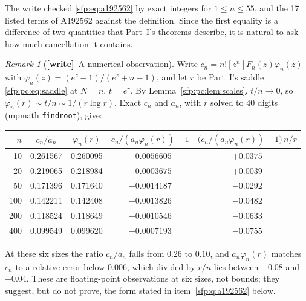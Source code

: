 \documentclass[11pt,letterpaper]{article}
\numberwithin{equation}{section}
\theoremstyle{definition}\newtheorem{definition}[theorem]{Definition}
\theoremstyle{remark}\newtheorem{remark}[theorem]{Remark}
\newcommand{\wtag}{\textup{\textbf{[write]}}}
\begin{document}
The write checked \eqref{sfp:eq:a192562} by exact integers for $1\le n\le55$, and the 17 listed terms of A192562 against the definition. Since the first equality is a difference of two quantities that Part~I's theorems describe, it is natural to ask how much cancellation it contains.

\begin{remark}[\wtag\ A numerical observation]\label{sfp:rem:a192562}
Write $c_n=n![z^n]F_n(z)\varphi_n(z)$ with $\varphi_n(z)=(e^z-1)/(e^z+n-1)$, and let $r$ be Part~I's saddle \eqref{sfp:pc:eq:saddle} at $N=n$, $t=e^r$. By Lemma~\ref{sfp:pc:lem:scales}, $t/n\to0$, so $\varphi_n(r)\sim t/n\sim1/(r\log r)$. Exact $c_n$ and $a_n$, with $r$ solved to 40 digits (mpmath \texttt{findroot}), give:
\begin{center}
\small
\begin{tabular}{@{}rcccc@{}}
\toprule
$n$ & $c_n/a_n$ & $\varphi_n(r)$ & $c_n/(a_n\varphi_n(r))-1$ & $\bigl(c_n/(a_n\varphi_n(r))-1\bigr)\,n/r$\\
\midrule
10 & 0.261567 & 0.260095 & $+0.0056605$ & $+0.0375$\\
20 & 0.219065 & 0.218984 & $+0.0003675$ & $+0.0039$\\
50 & 0.171396 & 0.171640 & $-0.0014187$ & $-0.0292$\\
100 & 0.142211 & 0.142408 & $-0.0013826$ & $-0.0482$\\
200 & 0.118524 & 0.118649 & $-0.0010546$ & $-0.0633$\\
400 & 0.099549 & 0.099620 & $-0.0007193$ & $-0.0755$\\
\bottomrule
\end{tabular}
\end{center}
At these six sizes the ratio $c_n/a_n$ falls from $0.26$ to $0.10$, and $a_n\varphi_n(r)$ matches $c_n$ to a relative error below $0.006$, which divided by $r/n$ lies between $-0.08$ and $+0.04$. These are floating-point observations at six sizes, not bounds; they suggest, but do not prove, the form stated in item~\ref{sfp:q:a192562} below.
\end{remark}
\end{document}
